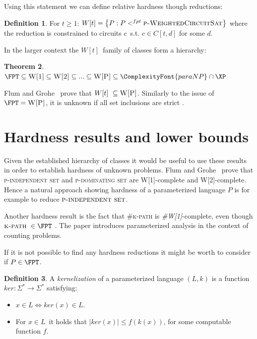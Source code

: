\documentclass[a4paper,11pt]{report}
\theoremstyle{plain}
\newtheorem{thm}{Theorem}[chapter] %
\theoremstyle{definition}
\newtheorem{defn}[thm]{Definition} %
\newcommand{\PARANP}{\ComplexityFont{paraNP}}
\begin{document}
Using this statement we can define relative hardness though reductions:

\begin{defn}
For $t \ge 1$: $W[t] = \left\{P : P <^{fpt} \textsc{p-WeightedCircuitSat} \right\}$ where the reduction is constrained to circuits $c$ s.t. $c \in C[t, d]$ for some $d$.
\end{defn}


In the larger context the $W[t]$ family of classes form a hierarchy:

\begin{thm}
$\FPT \subseteq \textsc{W[1]} \subseteq \textsc{W[2]} \subseteq ...  \subseteq \textsc{W[P]} \subseteq \PARANP \cap \XP$
\end{thm}

Flum and Grohe~\cite{FG06} prove that $W[t] \subseteq \textsc{W[P]}$.
Similarly to the issue of $\FPT = \textsc{W[P]}$, it is unknown if all set inclusions are strict \cite{FG06}.

\section{Hardness results and lower bounds}
Given the established hierarchy of classes it would be useful to use these results in order to establish hardness of unknown problems.
Flum and Grohe~\cite{FG06} prove that \textsc{p-independent set} and \textsc{p-dominating set} are \textsc{W[1]}-complete and \textsc{W[2]}-complete.
Hence a natural approach showing hardness of a parameterized language $P$ is for example to reduce $\textsc{p-independent set}$.

Another hardness result is the fact that \textsc{\#k-path} is \emph{\#W[1]}-complete, even though $\textsc{k-path} \in \FPT$ \cite{FG04}.
The paper introduces parameterized analysis in the context of counting problems.

If it is not possible to find any hardness reductions it might be worth to consider if $P \in \FPT$.

\begin{defn}
A \emph{kernelization} of a parameterized language $(L, k)$ is a function $ker : \Sigma^* \rightarrow \Sigma^*$ satisfying:
\begin{itemize}
\item $x \in L \Leftrightarrow ker(x) \in L$.
\item For $x \in L$ it holds that $|ker(x)| \leq f(k(x))$, for some computable function $f$.
\end{itemize}
\end{defn}
\end{document}
